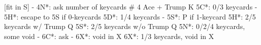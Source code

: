 [fit in S] - 4N*: ask number of keycards  # 4 Ace + Trump K
5C*: 0/3 keycards
   - 5H*: escape to 5S if 0-keycards
5D*: 1/4 keycards
   - 5S*: P if 1-keycard
5H*: 2/5 keycards w/ Trump Q
5S*: 2/5 keycards w/o Trump Q
5N*: 0/2/4 keycards, some void
   - 6C*: ask
        - 6X*: void in X
6X*: 1/3 keycards, void in X

